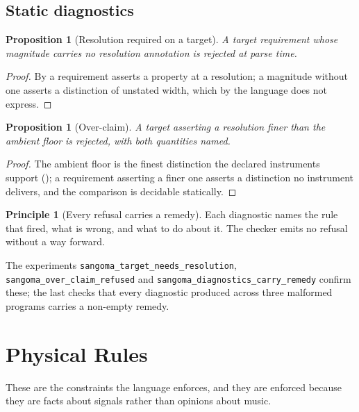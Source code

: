 \documentclass[11pt,twocolumn,a4paper]{article}
\newtheorem{proposition}[theorem]{Proposition}
\theoremstyle{definition}
\newtheorem{principle}[theorem]{Principle}
\theoremstyle{remark}
\begin{document}
\subsection{Static diagnostics}

\begin{proposition}[Resolution required on a target]
\label{prop:target-res}
A target requirement whose magnitude carries no resolution annotation is
rejected at parse time.
\end{proposition}

\begin{proof}
By  a requirement asserts a property at a resolution; a
magnitude without one asserts a distinction of unstated width, which by
 the language does not express.
\end{proof}

\begin{proposition}[Over-claim]
\label{prop:overclaim}
A target asserting a resolution finer than the ambient floor is rejected, with
both quantities named.
\end{proposition}

\begin{proof}
The ambient floor is the finest distinction the declared instruments support
(); a requirement asserting a finer one asserts a distinction no
instrument delivers, and the comparison is decidable statically.
\end{proof}

\begin{principle}[Every refusal carries a remedy]
\label{prin:remedy}
Each diagnostic names the rule that fired, what is wrong, and what to do about
it. The checker emits no refusal without a way forward.
\end{principle}

The experiments \texttt{sangoma\_target\_needs\_resolution},
\texttt{sangoma\_over\_claim\_refused} and
\texttt{sangoma\_diagnostics\_carry\_remedy} confirm these; the last checks that
every diagnostic produced across three malformed programs carries a non-empty
remedy.

\section{Physical Rules}
\label{sec:physical}

These are the constraints the language enforces, and they are enforced because
they are facts about signals rather than opinions about music.
\end{document}
